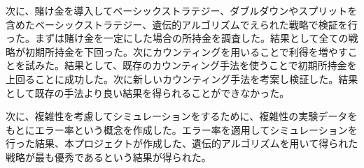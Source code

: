 次に、賭け金を導入してベーシックストラテジー、ダブルダウンやスプリットを含めたベーシックストラテジー、遺伝的アルゴリズムでえられた戦略で検証を行った。まずは賭け金を一定にした場合の所持金を調査した。結果として全ての戦略が初期所持金を下回った。次にカウンティングを用いることで利得を増やすことを試みた。結果として、既存のカウンティング手法を使うことで初期所持金を上回ることに成功した。次に新しいカウンティング手法を考案し検証した。結果として既存の手法より良い結果を得られることができなかった。

次に、複雑性を考慮してシミュレーションをするために、複雑性の実験データをもとにエラー率という概念を作成した。エラー率を適用してシミュレーションを行った結果、本プロジェクトが作成した、遺伝的アルゴリズムを用いて得られた戦略が最も優秀であるという結果が得られた。

